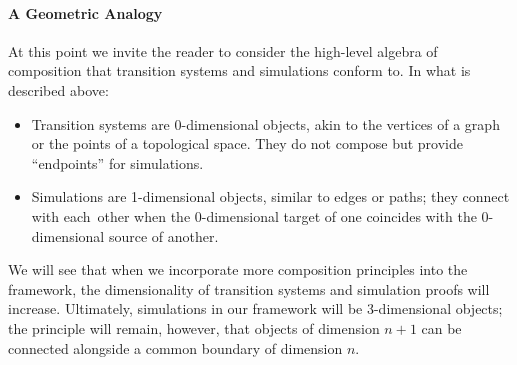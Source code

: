 \documentclass[acmsmall,screen,review,anonymous]{acmart}
\begin{document}
\paragraph{A Geometric Analogy}

At this point we invite the reader
to consider the high-level
algebra of composition that
transition systems and simulations conform to.
In what is described above:
\begin{itemize}
  \item Transition systems are 0-dimensional objects,
    akin to the vertices of a graph or
    the points of a topological space.
    They do not compose
    but provide ``endpoints'' for simulations.
  \item Simulations are 1-dimensional objects,
    similar to edges or paths;
    they connect with each~other
    when the 0-dimensional target of one coincides with
    the 0-dimensional source of another.
\end{itemize}
%
%
We will see that
when we incorporate more composition principles into the framework,
the dimensionality of transition systems and simulation proofs will increase.
Ultimately,
simulations in our framework will be 3-dimensional objects;
the principle will remain, however,
that objects of dimension $n+1$ can be connected
alongside a common boundary of dimension $n$.

\end{document}
